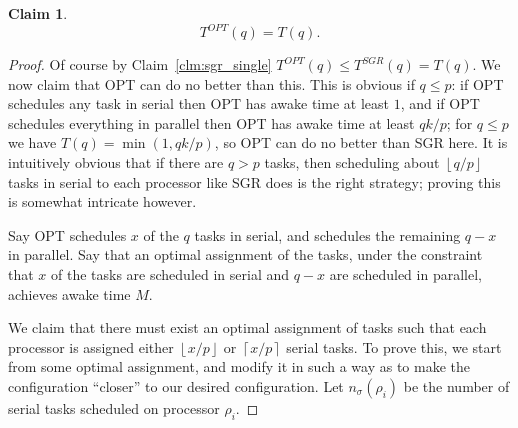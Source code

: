 \documentclass[twocolumn]{article}[10pt]
\newcommand{\floor}[1]{\left\lfloor #1 \right\rfloor}
\newcommand{\ceil}[1]{\left\lceil #1 \right\rceil}
\newtheorem{claim}{Claim}
\begin{document}
\begin{claim}
  \label{clm:opt_single}
  $$T^{OPT}(q) = T(q).$$
\end{claim}
\begin{proof}
  Of course by Claim~\ref{clm:sgr_single} $T^{OPT}(q) \le
  T^{SGR}(q) = T(q)$. We now claim that OPT can do no better than
  this. This is obvious if $q \le p$: if OPT schedules any task
  in serial then OPT has awake time at least $1$, and if OPT
  schedules everything in parallel then OPT has awake time at
  least $qk/p$; for $q\le p$ we have $T(q) = \min(1, qk/p)$, so
  OPT can do no better than SGR here. It is intuitively obvious
  that if there are $q> p$ tasks, then scheduling about
  $\floor{q/p}$ tasks in serial to each processor like SGR does
  is the right strategy; proving this is somewhat intricate
  however.

  Say OPT schedules $x$ of the $q$ tasks in serial, and
  schedules the remaining $q-x$ in parallel.
  Say that an optimal assignment of the tasks, under the constraint
  that $x$ of the tasks are scheduled in serial and $q-x$ are
  scheduled in parallel, achieves awake time $M$.

  We claim that there must exist an optimal assignment of tasks
  such that each processor is assigned either $\floor{x/p}$ or
  $\ceil{x/p}$ serial tasks. To prove this, we start from some
  optimal assignment, and modify it in such a way as to make the
  configuration \enquote{closer} to our desired configuration.
  Let $n_\sigma(\rho_i)$ be the number of serial tasks scheduled
  on processor $\rho_i$.


\end{proof}
\end{document}
